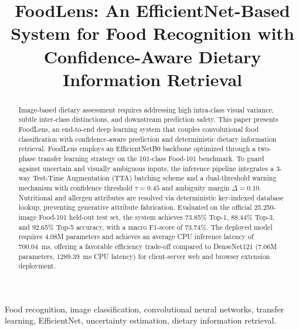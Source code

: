 \documentclass[conference]{IEEEtran}
\begin{document}
\title{FoodLens: An EfficientNet-Based System for Food Recognition with Confidence-Aware Dietary Information Retrieval}

\author{
}

\maketitle

\begin{abstract}
Image-based dietary assessment requires addressing high intra-class visual variance, subtle inter-class distinctions, and downstream prediction safety. This paper presents FoodLens, an end-to-end deep learning system that couples convolutional food classification with confidence-aware prediction and deterministic dietary information retrieval. FoodLens employs an EfficientNetB0 backbone optimized through a two-phase transfer learning strategy on the 101-class Food-101 benchmark. To guard against uncertain and visually ambiguous inputs, the inference pipeline integrates a 3-way Test-Time Augmentation (TTA) batching scheme and a dual-threshold warning mechanism with confidence threshold $\tau = 0.45$ and ambiguity margin $\Delta = 0.10$. Nutritional and allergen attributes are resolved via deterministic key-indexed database lookup, preventing generative attribute fabrication. Evaluated on the official 25,250-image Food-101 held-out test set, the system achieves 73.85\% Top-1, 88.44\% Top-3, and 92.65\% Top-5 accuracy, with a macro F1-score of 73.74\%. The deployed model requires 4.08M parameters and achieves an average CPU inference latency of 700.04~ms, offering a favorable efficiency trade-off compared to DenseNet121 (7.06M parameters, 1289.39~ms CPU latency) for client-server web and browser extension deployment.
\end{abstract}

\begin{IEEEkeywords}
Food recognition, image classification, convolutional neural networks, transfer learning, EfficientNet, uncertainty estimation, dietary information retrieval.
\end{IEEEkeywords}
\end{document}
